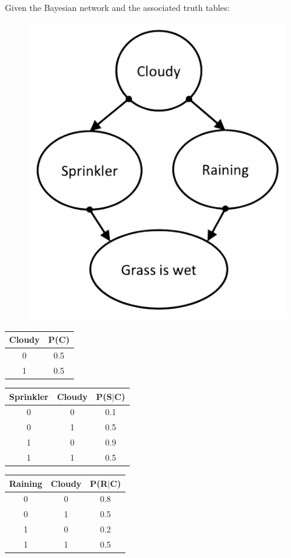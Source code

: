 \begin{example}
    Given the Bayesian network and the associated truth tables:
    \begin{figure}[H]
        \centering
        \includegraphics[width=0.3\linewidth]{images/sprinkler.png}
    \end{figure}
    \begin{table}[H]
        \centering
        \begin{tabular}{cc}
        \hline
        \textbf{Cloudy} & \textbf{P(C)} \\ \hline
        0      & 0.5  \\
        1      & 0.5  \\ \hline
        \end{tabular}
    \end{table}
    \begin{table}[H]
        \centering
        \begin{tabular}{ccc}
        \hline
        \textbf{Sprinkler} & \textbf{Cloudy} & \textbf{P(S$|$C)} \\ \hline
        0         & 0      & 0.1  \\
        0         & 1      & 0.5  \\
        1         & 0      & 0.9  \\
        1         & 1      & 0.5  \\ \hline
        \end{tabular}
    \end{table}
    \begin{table}[H]
        \centering
        \begin{tabular}{ccc}
        \hline
        \textbf{Raining} & \textbf{Cloudy} & \textbf{P(R$|$C)} \\ \hline
        0       & 0      & 0.8    \\
        0       & 1      & 0.5    \\
        1       & 0      & 0.2    \\
        1       & 1      & 0.5    \\ \hline

\end{tabular}
\end{table}
\end{example}

